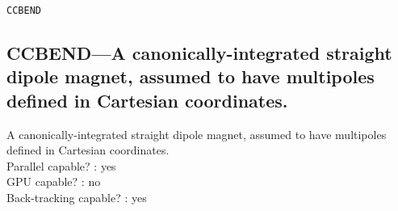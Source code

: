\vspace*{0.5in}

\vspace*{0.5in}

\newpage
\begin{center}{\Large\verb|CCBEND|}\end{center}
\subsection{CCBEND---A canonically-integrated straight dipole magnet, assumed to have multipoles defined in Cartesian coordinates.}
A canonically-integrated straight dipole magnet, assumed to have multipoles defined in Cartesian coordinates.
\\
Parallel capable? : yes\\
GPU capable? : no\\
Back-tracking capable? : yes\\

